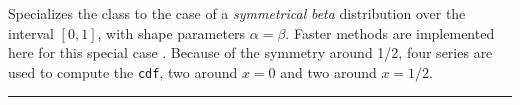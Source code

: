 
Specializes the class  to the case of a \emph{symmetrical}
{\em beta\/} distribution over the interval $[0,1]$,
with shape parameters $\alpha = \beta$.
Faster methods are implemented here for this special case \cite{rLEC06a}.
Because of the symmetry around 1/2, four series are used to compute the
\texttt{cdf}, two around $x = 0$ and two around $x = 1/2$.

\bigskip\hrule

